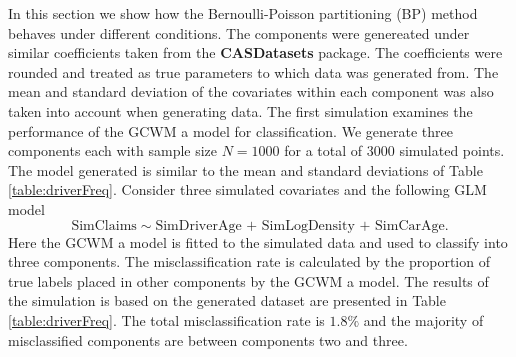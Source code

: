 \documentclass[11pt,letterpaper]{article}
\numberwithin{equation}{section}
\numberwithin{equation}{section}
\numberwithin{equation}{section}
\begin{document}
In this section we show how the Bernoulli-Poisson partitioning (BP) method  behaves under different conditions. The components were genereated under similar coefficients taken from the \textbf{CASDatasets} package. The coefficients were rounded and treated as true parameters to which data was generated from. The mean and standard deviation of the covariates within each component was also taken into account when generating data. The first simulation examines the performance of the GCWM a model for classification. We generate three components each with sample size $N=1000$ for a total of $3000$ simulated points.
The model generated is similar to the mean and standard deviations of Table \ref{table:driverFreq}. Consider three simulated covariates and the following GLM model
$$ \text{SimClaims} \sim \text{SimDriverAge + SimLogDensity + SimCarAge} . $$
 Here the GCWM a model is fitted to the simulated data and used to classify into three components. The misclassification rate is calculated by the proportion of true labels placed in other components by the GCWM a model.  The results of the simulation is based on the generated dataset are presented in Table \ref{table:driverFreq}. The total misclassification rate  is $1.8 \% $ and the majority of misclassified components are between components two and three.
\end{document}
